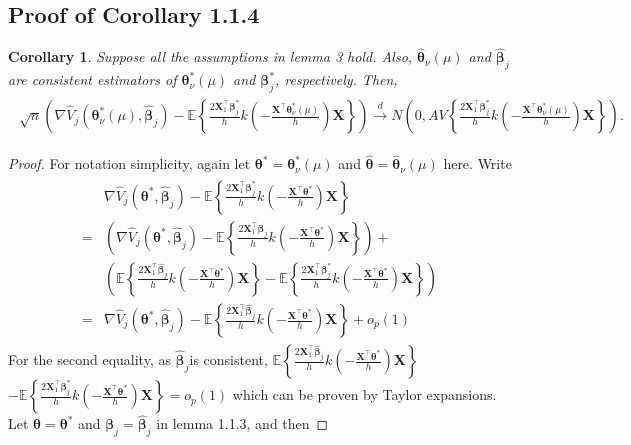 \documentclass{article}
\newcommand{\wh}{\widehat}
\newcommand{\itl}{\intercal}
\newcommand{\bs}{ \boldsymbol}
\newcommand{\lt}{\left}
\newcommand{\rt}{\right}
\newtheorem{corollary}[theorem]{Corollary}
\begin{document}
\begin{appendices}
\section{Proof of Corollary 1.1.4}
\begin{corollary}
	Suppose all the assumptions in lemma 3 hold. Also, $\wh{\bs{\theta}}_{\nu}\lt(\mu\rt)$ and $\widehat{\bs{\beta}}_{j}$ are consistent estimators of $\bs{\theta}^*_{\nu}\lt(\mu\rt)$ and $\bs{\beta}_{j}^*$, respectively. Then, 
	\begin{gather}
	\begin{flalign*}
	\sqrt{n}\lt(\nabla\wh{V}_j\lt(\bs{\theta}^*_{\nu}\lt(\mu\rt)  , \wh{\bs{\beta}}_j\rt) - \mathbb{E}\lt\{\frac{2\bs{X}_{1}^{\intercal}\bs{\beta}^*_j}{h}k\lt(-\frac{\bs{X}^{\intercal}\bs{\theta}^*_{\nu}\lt(\mu\rt)}{h}\rt)\bs{X}\rt\}\rt)\overset{d}{\to}N\lt(0,AV\lt\{\frac{2\bs{X}_1^{\itl}\bs{\beta}^*_j}{h}k\lt(-\frac{\bs{X}^{\itl}\bs{\theta}^*_{\nu}\lt(\mu\rt)}{h}\rt)\bs{X}\rt\}\rt).
	\end{flalign*}
	\end{gather}
\end{corollary}
\begin{proof} For notation simplicity, again let $\bs{\theta}^* = \bs{\theta}^*_{\nu}(\mu)$ and $\wh{\bs{\theta}} = \wh{\bs{\theta}}_{\nu}(\mu)$ here.
Write
\begin{gather*}
\begin{flalign*}
 & \nabla\wh{V}_j\lt(\bs{\theta}^* , \wh{\bs{\beta}}_j\rt) - \mathbb{E}\lt\{\frac{2\bs{X}_{1}^{\intercal}\bs{\beta}^*_j}{h}k\lt(-\frac{\bs{X}^{\intercal}\bs{\theta}^*}{h}\rt)\bs{X}\rt\} \\
=  & \lt( \nabla\wh{V}_j\lt(\bs{\theta}^* , \wh{\bs{\beta}}_j\rt) - \mathbb{E}\lt\{\frac{2\bs{X}_{1}^{\intercal}\wh{\bs{\beta}}_j}{h}k\lt(-\frac{\bs{X}^{\intercal}\bs{\theta}^*}{h}\rt)\bs{X}\rt\} \rt) + \\ & \lt( \mathbb{E}\lt\{\frac{2\bs{X}_{1}^{\intercal}\wh{\bs{\beta}}_j}{h}k\lt(-\frac{\bs{X}^{\intercal}\bs{\theta}^*}{h}\rt)\bs{X}\rt\} - \mathbb{E}\lt\{\frac{2\bs{X}_{1}^{\intercal}\bs{\beta}^*_j}{h}k\lt(-\frac{\bs{X}^{\intercal}\bs{\theta}^*}{h}\rt)\bs{X}\rt\} \rt) \\
=  & \nabla\wh{V}_j\lt(\bs{\theta}^* , \wh{\bs{\beta}}_j\rt) - \mathbb{E}\lt\{\frac{2\bs{X}_{1}^{\intercal}\wh{\bs{\beta}}_j}{h}k\lt(-\frac{\bs{X}^{\intercal}\bs{\theta}^*}{h}\rt)\bs{X}\rt\}  + o_p(1)
\end{flalign*}
\end{gather*}
For the second equality, as $\wh{\bs{\beta}}_j$is consistent, $\mathbb{E}\lt\{\frac{2\bs{X}_{1}^{\intercal}\wh{\bs{\beta}}_j}{h}k\lt(-\frac{\bs{X}^{\intercal}\bs{\theta}^*}{h}\rt)\bs{X}\rt\}$\\ $- \mathbb{E}\lt\{\frac{2\bs{X}_{1}^{\intercal}\bs{\beta}^*_j}{h}k\lt(-\frac{\bs{X}^{\intercal}\bs{\theta}^*}{h}\rt)\bs{X}\rt\} = o_p(1)$ which can be proven by Taylor expansions. Let $\bs{\theta} = \bs{\theta}^*$ and $\bs{\beta}_{j} = \wh{\bs{\beta}}_{j}$ in lemma 1.1.3, and then

\end{proof}
\end{appendices}
\end{document}
